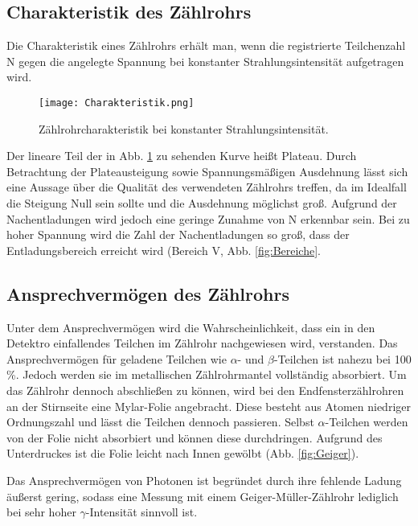 \subsection{Charakteristik des Zählrohrs}

Die Charakteristik eines Zählrohrs erhält man, wenn die registrierte Teilchenzahl
N gegen die angelegte Spannung bei konstanter Strahlungsintensität aufgetragen wird.

\begin{figure}
  \centering
  \texttt{[image: Charakteristik.png]}
  \caption{Zählrohrcharakteristik bei konstanter Strahlungsintensität.}
  \label{fig:Charakteristik}
\end{figure}

Der lineare Teil der in Abb. \ref{fig:Charakteristik} zu sehenden Kurve heißt
Plateau. Durch Betrachtung der Plateausteigung sowie Spannungsmäßigen Ausdehnung
lässt sich eine Aussage über die Qualität des verwendeten Zählrohrs treffen, da
im Idealfall die Steigung Null sein sollte und die Ausdehnung möglichst groß.
Aufgrund der Nachentladungen wird jedoch eine geringe Zunahme von N erkennbar sein.
Bei zu hoher Spannung wird die Zahl der Nachentladungen so groß, dass der Entladungsbereich
erreicht wird (Bereich V, Abb. \ref{fig:Bereiche}.

\subsection{Ansprechvermögen des Zählrohrs}

Unter dem Ansprechvermögen wird die Wahrscheinlichkeit, dass ein in den
Detektro einfallendes Teilchen im Zählrohr nachgewiesen wird, verstanden.
Das Ansprechvermögen für geladene Teilchen wie $\alpha$- und $\beta$-Teilchen ist
nahezu bei 100 \%. Jedoch werden sie im metallischen Zählrohrmantel vollständig
absorbiert. Um das Zählrohr dennoch abschließen zu können,
wird bei den Endfensterzählrohren an der Stirnseite eine Mylar-Folie angebracht.
Diese besteht aus Atomen niedriger Ordnungszahl und lässt die Teilchen dennoch passieren.
Selbst $\alpha$-Teilchen werden von der Folie nicht absorbiert und können
diese durchdringen.
Aufgrund des Unterdruckes ist die Folie leicht nach Innen gewölbt (Abb. \ref{fig:Geiger}).

Das Ansprechvermögen von Photonen ist begründet durch ihre fehlende Ladung äußerst
gering, sodass eine Messung mit einem Geiger-Müller-Zählrohr lediglich bei
sehr hoher $\gamma$-Intensität sinnvoll ist.

